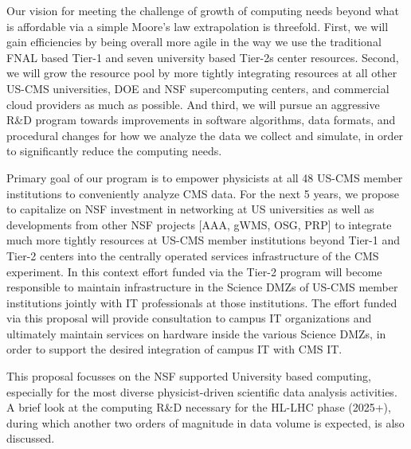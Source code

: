 \documentclass[11pt,a4paper]{article}
\begin{document}
Our vision for meeting the challenge of growth of computing needs
beyond what is affordable via a simple Moore's law extrapolation is
threefold. First, we will gain efficiencies by being overall more
agile in the way we use the traditional FNAL based Tier-1 and seven
university based Tier-2s center resources. Second, we will grow the
resource pool by more tightly integrating resources at all other
US-CMS universities, DOE and NSF supercomputing centers, and
commercial cloud providers as much as possible. And third, we will
pursue an aggressive R\&D program towards improvements in software
algorithms, data formats, and procedural changes for how we analyze
the data we collect and simulate, in order to significantly reduce the
computing needs.

Primary goal of our program is to empower physicists at all 48 US-CMS member institutions 
to conveniently analyze CMS data. %
For the next 5 years, we propose to capitalize on NSF investment in networking at US universities
as well as developments from other NSF projects [AAA, gWMS, OSG, PRP]
to integrate much more tightly resources at US-CMS member institutions beyond Tier-1 and Tier-2 centers
into the centrally operated services infrastructure of the CMS experiment.
In this context effort funded via the Tier-2 program will become responsible to maintain
infrastructure in the Science DMZs of US-CMS member institutions jointly with IT professionals at those institutions.
The effort funded via this proposal will provide consultation to campus IT organizations and ultimately maintain services
on hardware inside the various Science DMZs, in order to support the desired integration of campus IT with CMS IT.


This proposal focusses on the NSF supported University
based computing, especially for the most diverse %
physicist-driven
scientific data analysis activities. A brief look at the computing 
R\&D necessary for the HL-LHC phase (2025+), during which 
another two orders of magnitude in data volume is expected, 
is also discussed.
\end{document}
